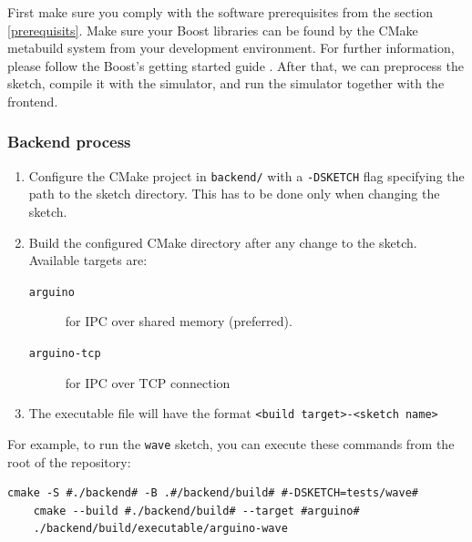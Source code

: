 First make sure you comply with the software prerequisites from the section \ref{prerequisits}. Make sure your Boost libraries can be found by the CMake metabuild system from your development environment. For further information, please follow the Boost's getting started guide \cite{boost_get_started}. After that, we can preprocess the sketch, compile it with the simulator, and run the simulator together with the frontend.

\subsubsection{Backend process}
\begin{enumerate}
    \item Configure the CMake project in \texttt{backend/} with a \texttt{-DSKETCH} flag specifying the path to the sketch directory. This has to be done only when changing the sketch.
    
    \item Build the configured CMake directory after any change to the sketch. Available targets are:
    
    \begin{description}
        \item[\texttt{arguino}] for IPC over shared memory (preferred).
        \item[\texttt{arguino-tcp}] for IPC over TCP connection
    \end{description}

    \item The executable file will have the format \texttt{<build target>-<sketch name>}
\end{enumerate}

For example, to run the \texttt{wave} sketch, you can execute these commands from the root of the repository: \footnotemark

\begin{lstlisting}[language=shell, caption={Example build process of the backend}]
    cmake -S #./backend# -B .#/backend/build# #-DSKETCH=tests/wave#
    cmake --build #./backend/build# --target #arguino#
    ./backend/build/executable/arguino-wave
\end{lstlisting}


